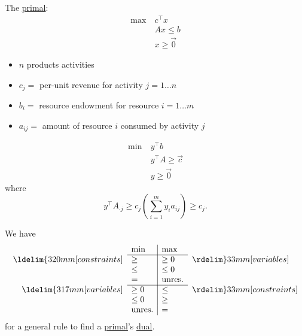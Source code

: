 \begin{prev}
	The \hyperref[def:primal]{primal}:
	\[
		\begin{aligned}
			\max~ & c^{\top}x     \\
			      & Ax \leq b     \\
			      & x\geq \vec{0}
		\end{aligned}
	\]
	\begin{itemize}
		\item \(n\) products activities
		\item \(c_{j}=\) per-unit revenue for activity \(j = 1\ldots n\)
		\item \(b_{i}=\) resource endowment for resource \(i = 1\ldots m\)
		\item \(a_{ij}=\) amount of resource \(i\) consumed by activity \(j\)
	\end{itemize}
	\[
		\begin{aligned}
			\min~ & y^{\top}b               \\
			      & y^{\top} A\geq  \vec{c} \\
			      & y\geq \vec{0}
		\end{aligned}
	\]
	where \[
		y^{\top}A_{\cdot j}\geq c_{j}(\sum\limits_{i=1}^{m} y_{i}a_{ij}) \geq c_{j}.
	\]
\end{prev}

\begin{note}
	We have
	\[
		\begin{array}{rl|ll}

			                                & \min          & \max          &                                \\
			\cline{2-3}
			\ldelim\{{3}{20mm}[constraints] & \geq          & \geq 0        & \rdelim\}{3}{3mm}[variables]   \\
			                                & \leq          & \leq 0        &                                \\
			                                & =             & \mbox{unres.} &                                \\
			\cline{2-3}
			\ldelim\{{3}{17mm}[variables]   & \geq 0        & \leq          & \rdelim\}{3}{3mm}[constraints] \\
			                                & \leq 0        & \geq          &                                \\
			                                & \mbox{unres.} & =             &                                \\
		\end{array}
	\]
	for a general rule to find a \hyperref[def:primal]{primal}'s \hyperref[def:dual]{dual}.
\end{note}

